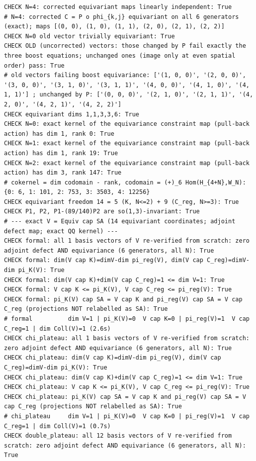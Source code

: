 \documentclass{article}
\theoremstyle{remark}
\begin{document}
\begin{lstlisting}
CHECK N=4: corrected equivariant maps linearly independent: True
# N=4: corrected C = P o phi_{k,j} equivariant on all 6 generators (exact); maps [(0, 0), (1, 0), (1, 1), (2, 0), (2, 1), (2, 2)]
CHECK N=0 old vector trivially equivariant: True
CHECK OLD (uncorrected) vectors: those changed by P fail exactly the three boost equations; unchanged ones (image only at even spatial order) pass: True
# old vectors failing boost equivariance: ['(1, 0, 0)', '(2, 0, 0)', '(3, 0, 0)', '(3, 1, 0)', '(3, 1, 1)', '(4, 0, 0)', '(4, 1, 0)', '(4, 1, 1)'] ; unchanged by P: ['(0, 0, 0)', '(2, 1, 0)', '(2, 1, 1)', '(4, 2, 0)', '(4, 2, 1)', '(4, 2, 2)']
CHECK equivariant dims 1,1,3,3,6: True
CHECK N=0: exact kernel of the equivariance constraint map (pull-back action) has dim 1, rank 0: True
CHECK N=1: exact kernel of the equivariance constraint map (pull-back action) has dim 1, rank 19: True
CHECK N=2: exact kernel of the equivariance constraint map (pull-back action) has dim 3, rank 147: True
# cokernel = dim codomain - rank, codomain = (+)_6 Hom(H_{4+N},W_N): {0: 6, 1: 101, 2: 753, 3: 3503, 4: 12256}
CHECK equivariant freedom 14 = 5 (K, N<=2) + 9 (C_reg, N>=3): True
CHECK P1, P2, P1-(89/140)P2 are so(1,3)-invariant: True
# --- exact V = Equiv cap SA (14 equivariant coordinates; adjoint defect map; exact QQ kernel) ---
CHECK formal: all 1 basis vectors of V re-verified from scratch: zero adjoint defect AND equivariance (6 generators, all N): True
CHECK formal: dim(V cap K)=dimV-dim pi_reg(V), dim(V cap C_reg)=dimV-dim pi_K(V): True
CHECK formal: dim(V cap K)+dim(V cap C_reg)=1 <= dim V=1: True
CHECK formal: V cap K <= pi_K(V), V cap C_reg <= pi_reg(V): True
CHECK formal: pi_K(V) cap SA = V cap K and pi_reg(V) cap SA = V cap C_reg (projections NOT relabelled as SA): True
# formal          dim V=1 | pi_K(V)=0  V cap K=0 | pi_reg(V)=1  V cap C_reg=1 | dim Coll(V)=1 (2.6s)
CHECK chi_plateau: all 1 basis vectors of V re-verified from scratch: zero adjoint defect AND equivariance (6 generators, all N): True
CHECK chi_plateau: dim(V cap K)=dimV-dim pi_reg(V), dim(V cap C_reg)=dimV-dim pi_K(V): True
CHECK chi_plateau: dim(V cap K)+dim(V cap C_reg)=1 <= dim V=1: True
CHECK chi_plateau: V cap K <= pi_K(V), V cap C_reg <= pi_reg(V): True
CHECK chi_plateau: pi_K(V) cap SA = V cap K and pi_reg(V) cap SA = V cap C_reg (projections NOT relabelled as SA): True
# chi_plateau     dim V=1 | pi_K(V)=0  V cap K=0 | pi_reg(V)=1  V cap C_reg=1 | dim Coll(V)=1 (0.7s)
CHECK double_plateau: all 12 basis vectors of V re-verified from scratch: zero adjoint defect AND equivariance (6 generators, all N): True

\end{lstlisting}
\end{document}
